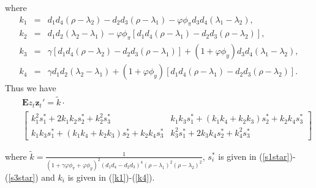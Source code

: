 \begin{appendix}
where
\begin{eqnarray}
k_1&=&d_1d_4(\rho-\lambda_2)-d_2d_3(\rho-\lambda_1)-\varphi\phi_\pi
d_3d_4(\lambda_1-\lambda_2),\label{k1}\\
k_2&=&d_1d_2(\lambda_2-\lambda_1)-\varphi\phi_\pi[d_1d_4(\rho-\lambda_1)-d_2d_3(\rho-\lambda_2)],\label{k2}\\
k_3&=&\gamma[d_1d_4(\rho-\lambda_2)-d_2d_3(\rho-\lambda_1)]+(1+\varphi\phi_y)d_3d_4(\lambda_1-\lambda_2),\label{k3}\\
k_4&=&\gamma
d_1d_2(\lambda_2-\lambda_1)+(1+\varphi\phi_y)[d_1d_4(\rho-\lambda_1)-d_2d_3(\rho-\lambda_2)].\label{k4}
\end{eqnarray}
Thus we have
\begin{eqnarray}\label{varzexp1}
   &&  {\pmb E z}_{t}{\pmb z}_t'=\widetilde{k}\cdot\nonumber\\
       &&\left[\begin{array}{cc}
k_1^2s_1^*+2k_1k_2s_2^*+k_2^2s_3^*&k_1k_3s_1^*+(k_1k_4+k_2k_3)s_2^*+k_2k_4s_3^*\\
k_1k_3s_1^*+(k_1k_4+k_2k_3)s_2^*+k_2k_4s_3^*&k_3^2s_1^*+2k_3k_4s_2^*+k_4^2s_3^*
\end{array}\right]
\end{eqnarray}

where
$\widetilde{k}=\frac{1}{(1+\gamma\varphi\phi_\pi+\varphi\phi_y)^2(d_1d_4-d_2d_3)^4(\rho-\lambda_1)^2(\rho-\lambda_2)^2}$,
$s_i^*$ is given in (\ref{s1star})-(\ref{s3star}) and $k_i$ is given
in (\ref{k1})-(\ref{k4}).


\end{appendix}
